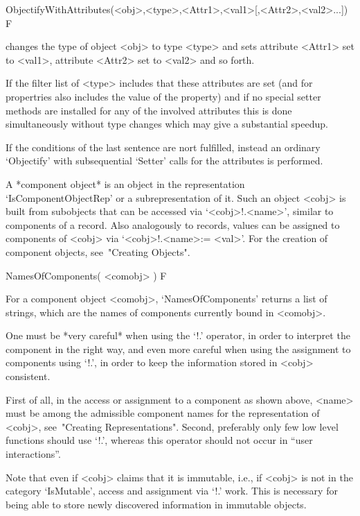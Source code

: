 \>ObjectifyWithAttributes(<obj>,<type>,<Attr1>,<val1>[,<Attr2>,<val2>...]) F

changes the type of object <obj> to type <type> and sets
attribute <Attr1> set to <val1>, attribute
<Attr2> set to <val2> and so forth.

If the filter list of <type> includes that these attributes are set (and for
propertries also includes the value of the property) and if no special
setter methods are installed for any of the involved attributes this is done
simultaneously without type changes which may give a substantial speedup.

If the conditions of the last sentence are nort fulfilled, instead an
ordinary `Objectify' with subsequential `Setter' calls for the attributes is
performed.


A *component object* is an object in the representation
`IsComponentObjectRep' or a subrepresentation of it.
Such an object <cobj> is built from subobjects that can be accessed via
`<cobj>!.<name>', similar to components of a record.
Also analogously to records, values can be assigned to components of
<cobj> via `<cobj>!.<name>:= <val>'.
For the creation of component objects, see~"Creating Objects".

\>NamesOfComponents( <comobj> ) F

For a component object <comobj>, `NamesOfComponents' returns a list of
strings, which are the names of components currently bound in <comobj>.

One must be *very careful* when using the `!.' operator,
in order to interpret the component in the right way,
and even more careful when using the assignment to components using `!.',
in order to keep the information stored in <cobj> consistent.

First of all, in the access or assignment to a component as shown above,
<name> must be among the admissible component names
for the representation of <cobj>, see~"Creating Representations".
Second, preferably only few low level functions should use `!.',
whereas this operator should not occur in ``user interactions''.

Note that even if <cobj> claims that it is immutable, i.e., if <cobj>
is not in the category `IsMutable', access and assignment via `!.' work.
This is necessary for being able to store newly discovered information
in immutable objects.

